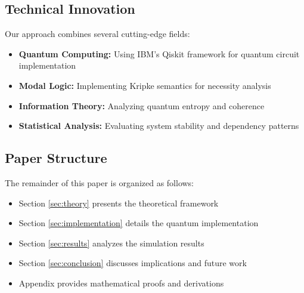 \subsection{Technical Innovation}
Our approach combines several cutting-edge fields:
\begin{itemize}
    \item \textbf{Quantum Computing:} Using IBM's Qiskit framework for quantum circuit implementation
    \item \textbf{Modal Logic:} Implementing Kripke semantics for necessity analysis
    \item \textbf{Information Theory:} Analyzing quantum entropy and coherence
    \item \textbf{Statistical Analysis:} Evaluating system stability and dependency patterns
\end{itemize}

\subsection{Paper Structure}
The remainder of this paper is organized as follows:
\begin{itemize}
    \item Section \ref{sec:theory} presents the theoretical framework
    \item Section \ref{sec:implementation} details the quantum implementation
    \item Section \ref{sec:results} analyzes the simulation results
    \item Section \ref{sec:conclusion} discusses implications and future work
    \item Appendix provides mathematical proofs and derivations
\end{itemize}